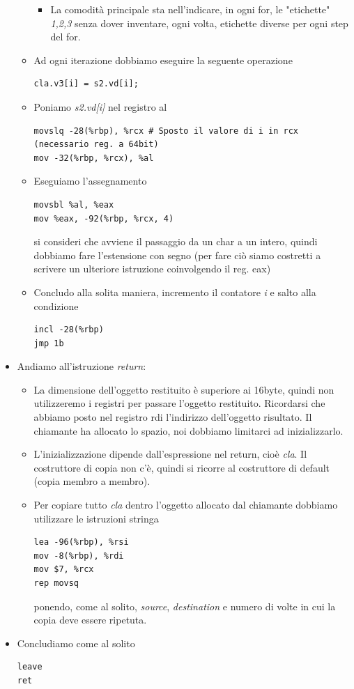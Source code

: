 \documentclass[11pt]{report}
\theoremstyle{definition}
\begin{document}
\begin{itemize}
\begin{itemize}
\begin{framed}
\begin{itemize}
\begin{itemize}
\end{itemize}
\item La comodità principale sta nell'indicare, in ogni for, le "etichette" \emph{1,2,3} senza dover inventare, ogni volta, etichette diverse per ogni step del for.
\end{itemize}
\end{framed}
\item Ad ogni iterazione dobbiamo eseguire la seguente operazione
\begin{verbatim}
cla.v3[i] = s2.vd[i];
\end{verbatim}
\item Poniamo \emph{s2.vd[i]} nel registro al
\begin{verbatim}
movslq -28(%rbp), %rcx # Sposto il valore di i in rcx (necessario reg. a 64bit)
mov -32(%rbp, %rcx), %al
\end{verbatim}
\item Eseguiamo l'assegnamento
\begin{verbatim}
movsbl %al, %eax
mov %eax, -92(%rbp, %rcx, 4)
\end{verbatim}
si consideri che avviene il passaggio da un char a un intero, quindi dobbiamo fare l'estensione con segno (per fare ciò siamo costretti a scrivere un ulteriore istruzione coinvolgendo il reg. eax)
\item Concludo alla solita maniera, incremento il contatore \emph{i} e salto alla condizione
\begin{verbatim}
incl -28(%rbp)
jmp 1b
\end{verbatim}
\end{itemize}
\item Andiamo all'istruzione \emph{return}:
\begin{itemize}
\item La dimensione dell'oggetto restituito è superiore ai 16byte, quindi non utilizzeremo i registri per passare l'oggetto restituito. Ricordarsi che abbiamo posto nel registro rdi l'indirizzo dell'oggetto risultato. Il chiamante ha allocato lo spazio, noi dobbiamo limitarci ad inizializzarlo.
\item L'inizializzazione dipende dall'espressione nel return, cioè \emph{cla}. Il costruttore di copia non c'è, quindi si ricorre al costruttore di default (copia membro a membro).
\item Per copiare tutto \emph{cla} dentro l'oggetto allocato dal chiamante dobbiamo utilizzare le istruzioni stringa
\begin{verbatim}
lea -96(%rbp), %rsi
mov -8(%rbp), %rdi
mov $7, %rcx
rep movsq
\end{verbatim}
ponendo, come al solito, \emph{source}, \emph{destination} e numero di volte in cui la copia deve essere ripetuta.
\end{itemize}
\item Concludiamo come al solito
\begin{verbatim}
leave
ret
\end{verbatim}
\end{itemize}
\end{document}
